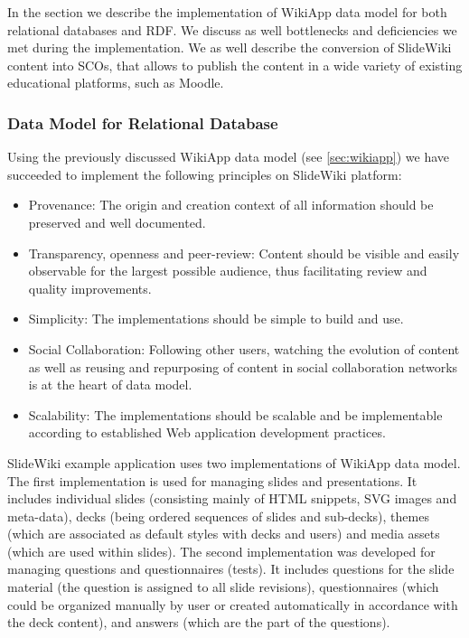 \documentclass[ngerman,UKenglish,table]{scrbook}
\begin{document}
In the section we describe the implementation of WikiApp data model for both relational databases and RDF. 
We discuss as well bottlenecks and deficiencies we met during the implementation.
We as well describe the conversion of SlideWiki content into SCOs, that allows to publish the content in a wide variety of existing educational platforms, such as Moodle.

\subsubsection{Data Model for Relational Database}
\label{subsec:datamodel_rdb}

Using the previously discussed WikiApp data model (see \autoref{sec:wikiapp}) we have succeeded to implement the following principles on SlideWiki platform:
\begin{itemize}
\item Provenance: The origin and creation context of all information should be preserved and well documented.
\item Transparency, openness and peer-review: Content should be visible and easily observable for the largest possible audience, thus facilitating review and quality improvements.
\item Simplicity: The implementations should be simple to build and use.
\item Social Collaboration: Following other users, watching the evolution of content as well as reusing and repurposing of content in social collaboration networks is at the heart of data model.
\item Scalability: The implementations should be scalable and be implementable according to established Web application development practices.
\end{itemize}

SlideWiki example application uses two implementations of WikiApp data model. 
The first implementation is used for managing slides and presentations. 
It includes individual slides (consisting mainly of HTML snippets, SVG images and meta-data), decks (being ordered sequences of slides and sub-decks), themes (which are associated as default styles with decks and users) and media assets (which are used within slides). 
The second implementation was developed for managing questions and questionnaires (tests).
It includes questions for the slide material (the question is assigned to all slide revisions), questionnaires (which could be organized manually by user or created automatically in accordance with the deck content), and answers (which are the part of the questions).
\end{document}
